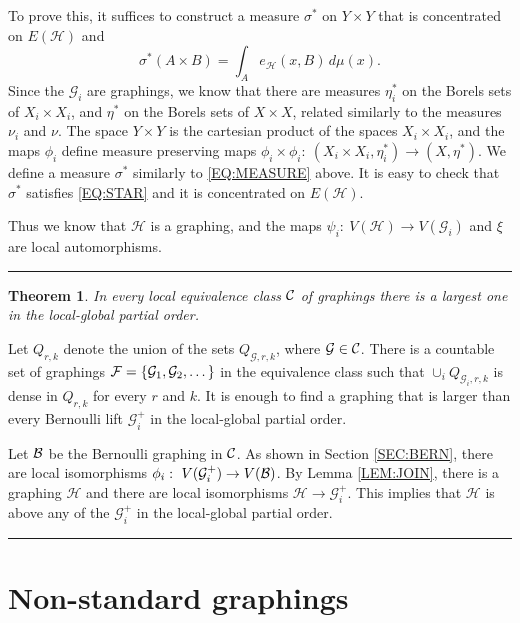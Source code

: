 \documentclass{article}
\newtheorem{theorem}{Theorem}[section]
\newenvironment{proof}{{\bf Proof.}}{\hfill\rule{2mm}{2mm}\medskip}
\def\GG{\mathcal{G}}\def\HH{\mathcal{H}}\def\II{\mathcal{I}}
\begin{document}
{\begin{proof}
To prove this, it suffices to construct a measure $\sigma^*$ on
$Y\times Y$ that is concentrated on $E(\HH)$ and
\begin{equation}\label{EQ:STAR}
\sigma^*(A\times B)=\int_A e_\HH(x,B)\,d\mu(x).
\end{equation}
Since the $\GG_i$ are graphings, we know that there are measures
$\eta_i^*$ on the Borels sets of $X_i\times X_i$, and $\eta^*$ on the
Borels sets of $X\times X$, related similarly to the measures $\nu_i$
and $\nu$. The space $Y\times Y$ is the cartesian product of the
spaces $X_i\times X_i$, and the maps $\phi_i$ define measure
preserving maps $\phi_i\times\phi_i:~(X_i\times
X_i,\eta_i^*)\to(X,\eta^*)$. We define a measure $\sigma^*$ similarly
to \eqref{EQ:MEASURE} above. It is easy to check that $\sigma^*$
satisfies \eqref{EQ:STAR} and it is concentrated on $E(\HH)$.

Thus we know that $\HH$ is a graphing, and the maps
$\psi_i:~V(\HH)\to V(\GG_i)$ and $\xi$ are local automorphisms.
\end{proof}


\begin{theorem}\label{THM:LOCGLOB-MAX}
In every local equivalence class $\mathcal{C}$ of graphings there is a
largest one in the local-global partial order.
\end{theorem}

\begin{proof}
Let $Q_{r,k}$ denote the union of the sets $Q_{\GG,r,k}$, where
$\GG\in\CC$. There is a countable set of graphings
$\FF=\{\GG_1,\GG_2,\dots\}$ in the equivalence class such that
$\cup_i Q_{\GG_i,r,k}$ is dense in $Q_{r,k}$  for every $r$ and $k$.
It is enough to find a graphing that is larger than every Bernoulli
lift $\GG_i^+$ in the local-global partial order.

Let $\mathcal{B}$ be the Bernoulli graphing in $\mathcal{C}$. As shown in Section
\ref{SEC:BERN}, there are local isomorphisms $\phi_i:~V(\GG_i^+)\to
V(\BB)$. By Lemma \ref{LEM:JOIN}, there is a graphing $\HH$ and there
are local isomorphisms $\HH\to\GG_i^+$. This implies that $\HH$ is
above any of the $\GG_i^+$ in the local-global partial order.
\end{proof}
}

\section{Non-standard graphings}\label{NONSTAND}
\end{document}

